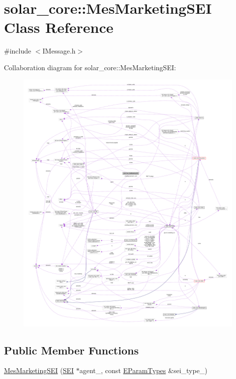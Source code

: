 \hypertarget{classsolar__core_1_1_mes_marketing_s_e_i}{}\section{solar\+\_\+core\+:\+:Mes\+Marketing\+S\+E\+I Class Reference}
\label{classsolar__core_1_1_mes_marketing_s_e_i}


{\ttfamily \#include $<$I\+Message.\+h$>$}



Collaboration diagram for solar\+\_\+core\+:\+:Mes\+Marketing\+S\+E\+I\+:
\nopagebreak
\begin{figure}[H]
\begin{center}
\leavevmode
\includegraphics[width=350pt]{classsolar__core_1_1_mes_marketing_s_e_i__coll__graph}
\end{center}
\end{figure}
\subsection*{Public Member Functions}
\begin{DoxyCompactItemize}
\item 
\hyperlink{classsolar__core_1_1_mes_marketing_s_e_i_ad6069a718526cffd0d74e9bcda12bd8a}{Mes\+Marketing\+S\+E\+I} (\hyperlink{classsolar__core_1_1_s_e_i}{S\+E\+I} $\ast$agent\+\_\+, const \hyperlink{namespacesolar__core_aa1147341e5ef7a40d68d1bd68e149362}{E\+Param\+Types} \&sei\+\_\+type\+\_\+)
\end{DoxyCompactItemize}
